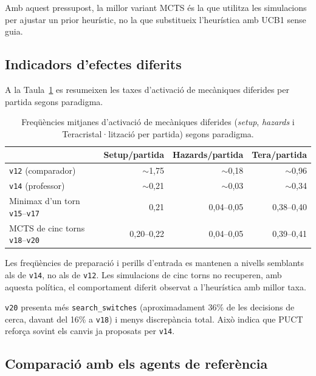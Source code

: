 Amb aquest pressupost, la millor variant MCTS és la que utilitza les simulacions per ajustar un prior heurístic, no la que substitueix l'heurística amb UCB1 sense guia.

\subsection{Indicadors d'efectes diferits}

A la Taula~\ref{tab:deferred_effects} es resumeixen les taxes d'activació de mecàniques diferides per partida segons paradigma.

\begin{table}[htbp]
\centering
\small
\caption{Freqüències mitjanes d'activació de mecàniques diferides (\emph{setup}, \emph{hazards} i Teracristal·lització per partida) segons paradigma.}
\label{tab:deferred_effects}
\begin{tabular}{lrrr}
\toprule
 & Setup/partida & Hazards/partida & Tera/partida \\
\midrule
\texttt{v12} (comparador) & $\sim$1,75 & $\sim$0,18 & $\sim$0,96 \\
\texttt{v14} (professor) & $\sim$0,21 & $\sim$0,03 & $\sim$0,34 \\
Minimax d'un torn \texttt{v15}--\texttt{v17} & 0,21 & 0,04--0,05 & 0,38--0,40 \\
MCTS de cinc torns \texttt{v18}--\texttt{v20} & 0,20--0,22 & 0,04--0,05 & 0,39--0,41 \\
\bottomrule
\end{tabular}
\end{table}

Les freqüències de preparació i perills d'entrada es mantenen a nivells semblants als de \texttt{v14}, no als de \texttt{v12}. Les simulacions de cinc torns no recuperen, amb aquesta política, el comportament diferit observat a l'heurística amb millor taxa.

\texttt{v20} presenta més \texttt{search\_switches} (aproximadament 36\% de les decisions de cerca, davant del 16\% a \texttt{v18}) i menys discrepància total. Això indica que PUCT reforça sovint els canvis ja proposats per \texttt{v14}.

\subsection{Comparació amb els agents de referència}

